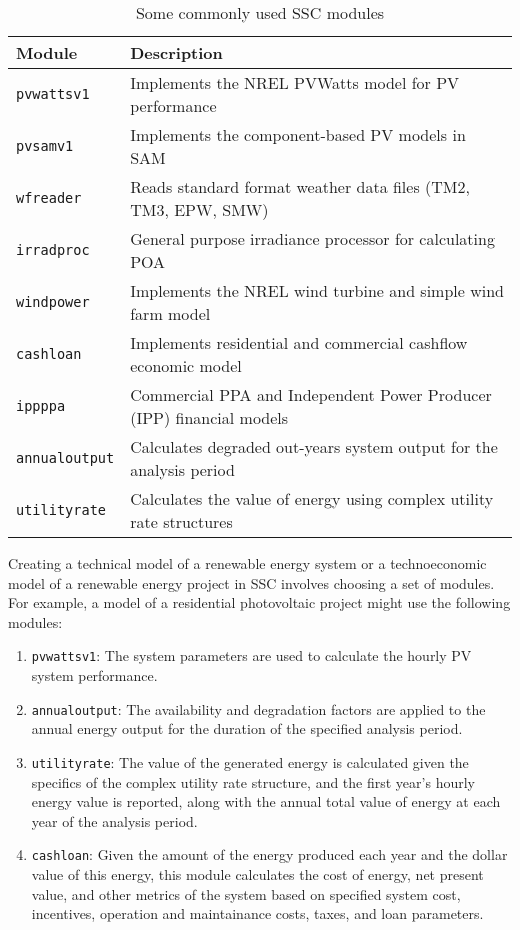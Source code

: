 \documentclass{article}
\begin{document}
\begin{table}[ht]
\begin{center}
\begin{tabular}{ll}
Module & Description \\
\hline
\texttt{pvwattsv1} & Implements the NREL PVWatts model for PV performance\\
\texttt{pvsamv1} & Implements the component-based PV models in SAM\\
\texttt{wfreader} & Reads standard format weather data files (TM2, TM3, EPW, SMW)\\
\texttt{irradproc} & General purpose irradiance processor for calculating POA\\
\texttt{windpower} & Implements the NREL wind turbine and simple wind farm model\\
\texttt{cashloan} & Implements residential and commercial cashflow economic model\\
\texttt{ippppa} & Commercial PPA and Independent Power Producer (IPP) financial models\\
\texttt{annualoutput} & Calculates degraded out-years system output for the analysis period\\
\texttt{utilityrate} & Calculates the value of energy using complex utility rate structures\\
\end{tabular}
\caption{Some commonly used SSC modules}
\label{tab_sample_modules}
\end{center}
\end{table}

Creating a technical model of a renewable energy system or a technoeconomic model of a renewable energy project in SSC involves choosing a set of modules. For example, a model of a residential photovoltaic project might use the following modules:

\begin{enumerate}
\item \texttt{pvwattsv1}: The system parameters are used to calculate the hourly PV system performance.
\item \texttt{annualoutput}: The availability and degradation factors are applied to the annual energy output for the duration of the specified analysis period.
\item \texttt{utilityrate}: The value of the generated energy is calculated given the specifics of the complex utility rate structure, and the first year's hourly energy value is reported, along with the annual total value of energy at each year of the analysis period.
\item \texttt{cashloan}: Given the amount of the energy produced each year and the dollar value of this energy, this module calculates the cost of energy, net present value, and other metrics of the system based on specified system cost, incentives, operation and maintainance costs, taxes, and loan parameters.
\end{enumerate}
\end{document}
